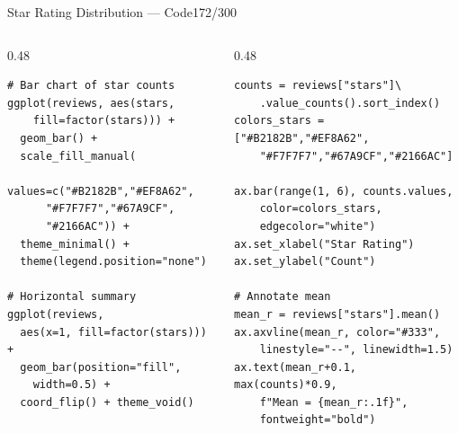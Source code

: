 \documentclass[10pt]{beamer}
\newcommand{\smark}[1]{\hfill{\scriptsize\color{codegray}#1}}
\begin{document}
\begin{frame}[fragile]{Star Rating Distribution --- Code}\smark{172/300}
\begin{columns}[T]
\begin{column}{0.48\textwidth}
\begin{lstlisting}[style=Rstyle]
# Bar chart of star counts
ggplot(reviews, aes(stars,
    fill=factor(stars))) +
  geom_bar() +
  scale_fill_manual(
    values=c("#B2182B","#EF8A62",
      "#F7F7F7","#67A9CF",
      "#2166AC")) +
  theme_minimal() +
  theme(legend.position="none")

# Horizontal summary
ggplot(reviews,
  aes(x=1, fill=factor(stars))) +
  geom_bar(position="fill",
    width=0.5) +
  coord_flip() + theme_void()
\end{lstlisting}
\end{column}
\begin{column}{0.48\textwidth}
\begin{lstlisting}[style=Pystyle]
counts = reviews["stars"]\
    .value_counts().sort_index()
colors_stars = ["#B2182B","#EF8A62",
    "#F7F7F7","#67A9CF","#2166AC"]

ax.bar(range(1, 6), counts.values,
    color=colors_stars,
    edgecolor="white")
ax.set_xlabel("Star Rating")
ax.set_ylabel("Count")

# Annotate mean
mean_r = reviews["stars"].mean()
ax.axvline(mean_r, color="#333",
    linestyle="--", linewidth=1.5)
ax.text(mean_r+0.1, max(counts)*0.9,
    f"Mean = {mean_r:.1f}",
    fontweight="bold")
\end{lstlisting}
\end{column}
\end{columns}
\end{frame}
\end{document}

